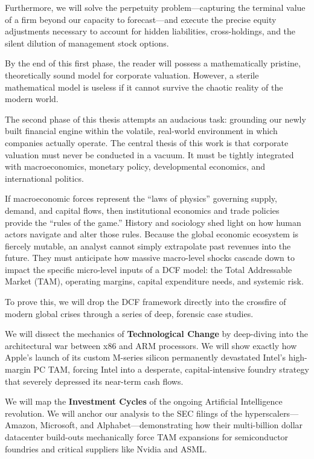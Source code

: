Furthermore, we will solve the perpetuity problem—capturing the terminal value of a firm beyond our capacity to forecast—and execute the precise equity adjustments necessary to account for hidden liabilities, cross-holdings, and the silent dilution of management stock options.

By the end of this first phase, the reader will possess a mathematically pristine, theoretically sound model for corporate valuation. However, a sterile mathematical model is useless if it cannot survive the chaotic reality of the modern world.

The second phase of this thesis attempts an audacious task: grounding our newly built financial engine within the volatile, real-world environment in which companies actually operate. The central thesis of this work is that corporate valuation must never be conducted in a vacuum. It must be tightly integrated with macroeconomics, monetary policy, developmental economics, and international politics.

If macroeconomic forces represent the ``laws of physics'' governing supply, demand, and capital flows, then institutional economics and trade policies provide the ``rules of the game.'' History and sociology shed light on how human actors navigate and alter those rules. Because the global economic ecosystem is fiercely mutable, an analyst cannot simply extrapolate past revenues into the future. They must anticipate how massive macro-level shocks cascade down to impact the specific micro-level inputs of a DCF model: the Total Addressable Market (TAM), operating margins, capital expenditure needs, and systemic risk.

To prove this, we will drop the DCF framework directly into the crossfire of modern global crises through a series of deep, forensic case studies.

We will dissect the mechanics of \textbf{Technological Change} by deep-diving into the architectural war between x86 and ARM processors. We will show exactly how Apple's launch of its custom M-series silicon permanently devastated Intel's high-margin PC TAM, forcing Intel into a desperate, capital-intensive foundry strategy that severely depressed its near-term cash flows.

We will map the \textbf{Investment Cycles} of the ongoing Artificial Intelligence revolution. We will anchor our analysis to the SEC filings of the hyperscalers—Amazon, Microsoft, and Alphabet—demonstrating how their multi-billion dollar datacenter build-outs mechanically force TAM expansions for semiconductor foundries and critical suppliers like Nvidia and ASML.

